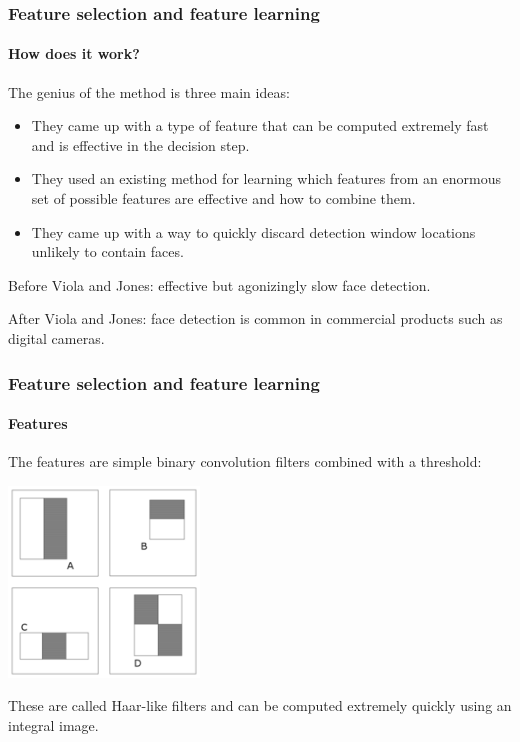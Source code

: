 \documentclass[aspectratio=169]{beamer}
\begin{document}
\begin{frame}
\frametitle{Feature selection and feature learning}
\framesubtitle{How does it work?}

The genius of the method is three main ideas:
\begin{itemize}
\item They came up with a \alert{type
  of feature} that can be computed extremely fast and is effective in
  the decision step.
\item They used an existing method for \alert{learning} which features from
  an enormous set of possible features are effective and how to combine
  them.
\item They came up with a way to quickly \alert{discard}
  detection window locations
  unlikely to contain faces.
\end{itemize}

\medskip

Before Viola and Jones: effective but agonizingly slow face detection.

\medskip

After Viola and Jones: face detection is common in commercial products
such as digital cameras.

\end{frame}


\begin{frame}
\frametitle{Feature selection and feature learning}
\framesubtitle{Features}

The \alert{features}
are simple binary convolution filters combined with a threshold:

\medskip

\centerline{\includegraphics[width=2in]{features}}

\medskip

These are called Haar-like filters and can be computed extremely quickly
using an \alert{integral image}.

\end{frame}
\end{document}
